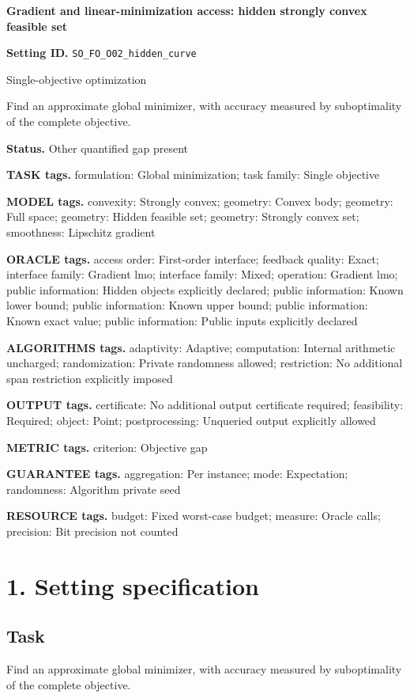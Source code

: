 \documentclass[10pt,a4paper]{article}
\begin{document}
\raggedright

{\LARGE\bfseries\sffamily\color{AtlasNavy} Gradient and linear-minimization access: hidden strongly convex feasible set\par}\vspace{5pt}
\textbf{Setting ID.} \texttt{SO\_\allowbreak{}FO\_\allowbreak{}O02\_\allowbreak{}hidden\_\allowbreak{}curve}

Single-objective optimization

Find an approximate global minimizer, with accuracy measured by suboptimality of the complete objective.

\textbf{Status.} Other quantified gap present

\textbf{TASK tags.} formulation: Global minimization; task family: Single objective

\textbf{MODEL tags.} convexity: Strongly convex; geometry: Convex body; geometry: Full space; geometry: Hidden feasible set; geometry: Strongly convex set; smoothness: Lipschitz gradient

\textbf{ORACLE tags.} access order: First-order interface; feedback quality: Exact; interface family: Gradient lmo; interface family: Mixed; operation: Gradient lmo; public information: Hidden objects explicitly declared; public information: Known lower bound; public information: Known upper bound; public information: Known exact value; public information: Public inputs explicitly declared

\textbf{ALGORITHMS tags.} adaptivity: Adaptive; computation: Internal arithmetic uncharged; randomization: Private randomness allowed; restriction: No additional span restriction explicitly imposed

\textbf{OUTPUT tags.} certificate: No additional output certificate required; feasibility: Required; object: Point; postprocessing: Unqueried output explicitly allowed

\textbf{METRIC tags.} criterion: Objective gap

\textbf{GUARANTEE tags.} aggregation: Per instance; mode: Expectation; randomness: Algorithm private seed

\textbf{RESOURCE tags.} budget: Fixed worst-case budget; measure: Oracle calls; precision: Bit precision not counted

\section{1. Setting specification}
\subsection{Task}
Find an approximate global minimizer, with accuracy measured by suboptimality of the complete objective.
\end{document}
